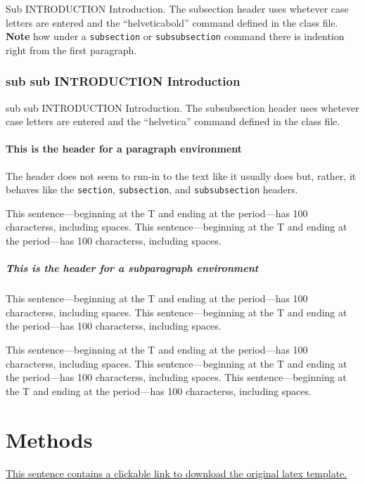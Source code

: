\documentclass[utf8]{my_class_1_front_vanc}  %
\begin{document}
Sub INTRODUCTION Introduction. The subsection header uses whetever case letters are entered and the
``helveticabold'' command defined in the class file. \textbf{Note} how under a {\tt subsection} or
{\tt subsubsection} command there is indention right from the first paragraph.

\subsubsection{sub sub INTRODUCTION Introduction}\label{} 

sub sub INTRODUCTION Introduction. The subsubsection header uses whetever case letters are entered
and the ``helvetica'' command defined in the class file.

\paragraph{This is the header for a paragraph environment} 

The header does not seem to run-in to the text like it usually does but, rather, it behaves like
the {\tt section}, {\tt subsection}, and {\tt subsubsection} headers.

This sentence---beginning at the T and ending at the period---has 100 characterss, including spaces. 
This sentence---beginning at the T and ending at the period---has 100 characterss, including spaces.

\subparagraph{This is the header for a subparagraph environment} 

This sentence---beginning at the T and ending at the period---has 100 characterss, including spaces.
This sentence---beginning at the T and ending at the period---has 100 characterss, including spaces.

This sentence---beginning at the T and ending at the period---has 100 characterss, including spaces.
This sentence---beginning at the T and ending at the period---has 100 characterss, including spaces.
This sentence---beginning at the T and ending at the period---has 100 characterss, including spaces.


\section{Methods}\label{methods}

\href{https://www.frontiersin.org/design/zip/Frontiers_LaTeX_Templates.zip}{This sentence contains a clickable link to download the original latex template.}
\end{document}
